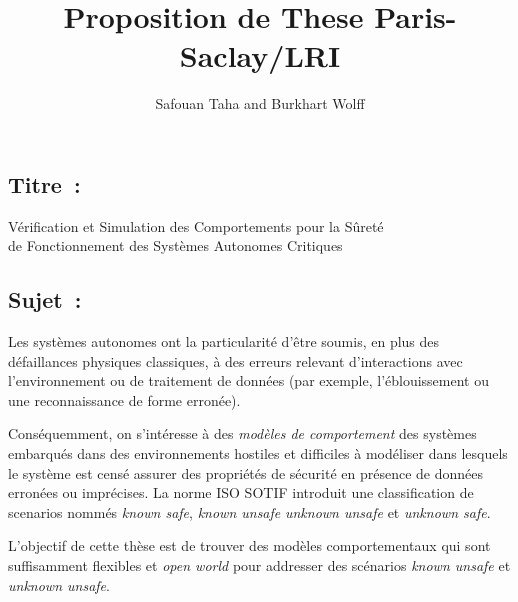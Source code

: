 \documentclass[a4paper,10pt]{article}
\begin{document}
\title{\textbf{Proposition de These Paris-Saclay/LRI}}
\author{Safouan Taha and Burkhart Wolff}
\date{}

\maketitle

\subsection*{Titre~:}
\begin{center}
\large Vérification et Simulation des Comportements pour la Sûreté \\ de Fonctionnement des Systèmes Autonomes Critiques
\end{center}

\subsection*{Sujet~:}
Les systèmes autonomes ont la particularité d'être soumis,
en plus des défaillances physiques classiques,
à des erreurs relevant d'interactions avec l'environnement
ou de traitement de données
(par exemple, l'éblouissement ou une reconnaissance de forme erronée).  

Conséquemment, on s'intéresse à des \emph{modèles de comportement}
des systèmes embarqués dans des environnements hostiles
et difficiles à modéliser
dans lesquels le système est censé assurer des propriétés de sécurité
en présence de données erronées ou imprécises.
La norme ISO SOTIF introduit une classification de scenarios
nommés \emph{known safe}, \emph{known unsafe} \emph{unknown unsafe} et
\emph{unknown safe}. 


L'objectif de cette thèse est de trouver des modèles comportementaux
qui sont suffisamment flexibles et \emph{open world}
pour addresser des scénarios \emph{known unsafe} et \emph{unknown unsafe}. 
\end{document}
